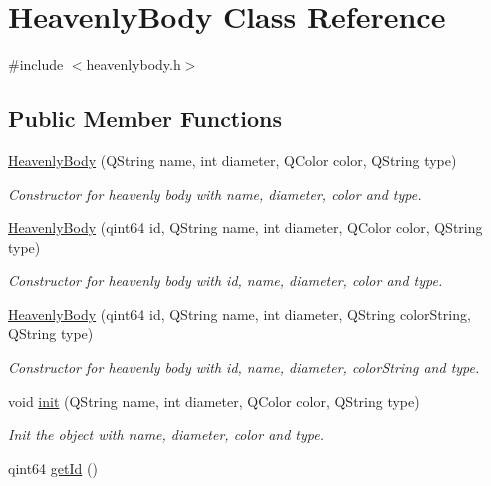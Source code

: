 \hypertarget{classHeavenlyBody}{
\section{\-Heavenly\-Body \-Class \-Reference}
\label{d0/dd5/classHeavenlyBody}
}


{\ttfamily \#include $<$heavenlybody.\-h$>$}

\subsection*{\-Public \-Member \-Functions}
\begin{DoxyCompactItemize}
\item 
\hyperlink{classHeavenlyBody_a15e90e5466a9f4b56f26e1a89b473834}{\-Heavenly\-Body} (\-Q\-String name, int diameter, \-Q\-Color color, \-Q\-String type)
\begin{DoxyCompactList}\small\item\em \-Constructor for heavenly body with name, diameter, color and type. \end{DoxyCompactList}\item 
\hyperlink{classHeavenlyBody_abc558dad2d83c2fc1e6dbb268c15b722}{\-Heavenly\-Body} (qint64 id, \-Q\-String name, int diameter, \-Q\-Color color, \-Q\-String type)
\begin{DoxyCompactList}\small\item\em \-Constructor for heavenly body with id, name, diameter, color and type. \end{DoxyCompactList}\item 
\hyperlink{classHeavenlyBody_a9f2a1dc813ae718379fce83467239547}{\-Heavenly\-Body} (qint64 id, \-Q\-String name, int diameter, \-Q\-String color\-String, \-Q\-String type)
\begin{DoxyCompactList}\small\item\em \-Constructor for heavenly body with id, name, diameter, color\-String and type. \end{DoxyCompactList}\item 
void \hyperlink{classHeavenlyBody_acaa58181b7c2fd1067e4752831c0a5c8}{init} (\-Q\-String name, int diameter, \-Q\-Color color, \-Q\-String type)
\begin{DoxyCompactList}\small\item\em \-Init the object with name, diameter, color and type. \end{DoxyCompactList}\item 
qint64 \hyperlink{classHeavenlyBody_a8cd3d97f94b35a2e783ecc046106ca78}{get\-Id} ()

\end{DoxyCompactItemize}
